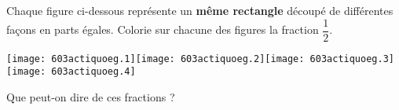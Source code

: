 \begin{myenumerate}
\item Chaque figure ci-dessous représente un {\bf même rectangle}
découpé de différentes façons en parts égales. Colorie sur chacune des
figures la fraction $\dfrac12$.
\par\texttt{[image: 603actiquoeg.1]}\hfill\texttt{[image: 603actiquoeg.2]}\hfill\texttt{[image: 603actiquoeg.3]}\hfill\texttt{[image: 603actiquoeg.4]}
\item\subitem{}\par{}
\item Que peut-on dire de ces fractions ? \dotfill\par\dotfill
\end{myenumerate}
